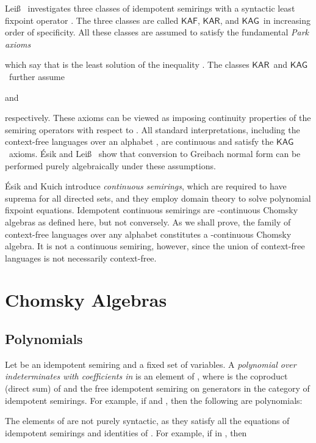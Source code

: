 \documentclass[copyright,creativecommons]{eptcs}
\theoremstyle{remark}
\newcommand\mathname[1]{\ensuremath{\mathsf{#1}}}
\newcommand\KAF{\mathname{KAF}}
\newcommand\KAR{\mathname{KAR}}
\newcommand\KAG{\mathname{KAG}}
\newcommand{\fhcomment}[1]{\textcolor{red}{[\textbf{Comment (FH)}: {#1}]}}
\newcommand{\dkcomment}[1]{\textcolor{blue}{[\textbf{Comment (DK)}: {#1}]}}
\renewcommand{\fhcomment}[1]{}
\renewcommand{\dkcomment}[1]{}
\begin{document}
Lei\ss\ \cite{leiss92b} investigates three classes of idempotent semirings with a syntactic least fixpoint operator . The three classes are called \KAF, \KAR, and \KAG\ in increasing order of specificity. All these classes are assumed to satisfy the fundamental \emph{Park axioms}

which say that  is the least solution of the inequality . The classes \KAR\ and \KAG\ further assume

and

respectively. These axioms can be viewed as imposing continuity properties of the semiring operators with respect to . All standard interpretations, including the context-free languages over an alphabet , are continuous and satisfy the \KAG\ axioms. \'Esik and Lei\ss\ \cite{esle2002,EsikLeiss05} show that conversion to Greibach normal form can be performed purely algebraically under these assumptions.

\'Esik and Kuich \cite{esik2007modern} introduce \emph{continuous semirings}, which are required to have suprema for all directed sets, and they
employ domain theory to solve polynomial fixpoint equations.  Idempotent  continuous semirings are -continuous Chomsky algebras as 
defined here, but not conversely.  As we shall prove, the family of context-free languages over any alphabet constitutes a -continuous Chomsky algebra.  It is not a continuous semiring, however, since the union of context-free languages is not necessarily context-free.   

\section{Chomsky Algebras}
\label{sec:CF}

\subsection{Polynomials}

Let  be an idempotent semiring and  a fixed set of variables. A \emph{polynomial over indeterminates  with coefficients in } is an element of , where  is the coproduct (direct sum) 
\fhcomment{Add: ``categorical'' before coproduct}\dkcomment{Why? What other kind is there?}\fhcomment{Good question.  I was thinking of categorical sum.}of  and the free idempotent semiring on generators  in the category of idempotent semirings. For example, if  and , then the following are polynomials:

The elements of  are not purely syntactic, as they satisfy all the equations of idempotent semirings and identities of . For example, if 
 in , then
\end{document}
